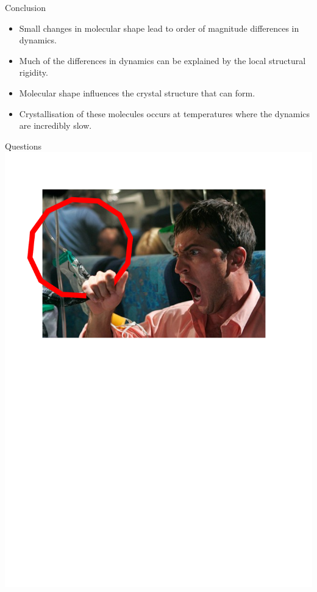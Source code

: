 \documentclass[16pt, aspectratio=43,compress]{beamer}
\begin{document}
\begin{frame}{Conclusion}
    \begin{itemize}
        \item Small changes in molecular shape lead to order of magnitude differences in dynamics.
        \item Much of the differences in dynamics can be explained by the local structural rigidity.
        \item Molecular shape influences the crystal structure that can form.
        \item Crystallisation of these molecules occurs at temperatures where the dynamics are incredibly slow.
    \end{itemize}
\end{frame}

\begin{frame}{Questions}
    \includegraphics[width=\textwidth]{ahhh}
\end{frame}
\end{document}
